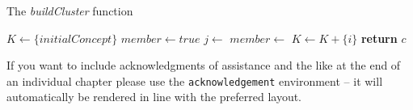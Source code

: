 \documentclass[graybox]{svmult}
\begin{document}
\begin{algorithm}
  \caption{The \emph{buildCluster} function}\label{buildCluster}
  \begin{algorithmic}[1]
    \State $K\gets \{initialConcept\}$
        \State $member \gets true$
          \State $j \gets$ 
          \State $member \gets$ 
            \State $K \gets K + \{i\}$
          \EndIf
        \EndWhile
      \EndIf
    \EndFor
    \State \textbf{return} $c$
    \EndFunction
  \end{algorithmic}
\end{algorithm}

\begin{acknowledgement}
If you want to include acknowledgments of assistance and the like at the end of an individual chapter please use the \verb|acknowledgement| environment -- it will automatically be rendered in line with the preferred layout.
\end{acknowledgement}


\end{document}
